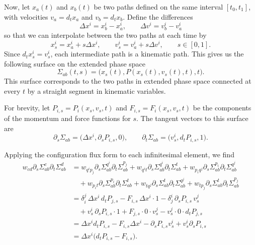 \documentclass[nofootinbib,aps,pre]{revtex4-2}
\begin{document}
Now, let $x_a(t)$ and $x_b(t)$ be two paths defined on the same interval $[t_0,t_1]$, with velocities $v_a=d_t x_a$ and $v_b=d_t x_b$. Define the differences
\begin{equation}
	\Delta x^i=x_b^i-x_a^i,
	\qquad
	\Delta v^i=v_b^i-v_a^i
\end{equation}
so that we can interpolate between the two paths at each time by
\begin{equation}
	x_s^i=x_a^i+s\Delta x^i,
	\qquad
	v_s^i=v_a^i+s\Delta v^i,
	\qquad s\in[0,1].
\end{equation}
Since $d_t x_s^i=v_s^i$, each intermediate path is a kinematic path. This gives us the following surface on the extended phase space
\begin{equation}
	\Sigma_{ab}(t,s)
	=
	\bigl(x_s(t),P(x_s(t),v_s(t),t),t\bigr).
\end{equation}
This surface corresponds to the two paths in extended phase space connected at every $t$ by a straight segment in kinematic variables.

For brevity, let $P_{i,s}=P_i(x_s,v_s,t)$ and $F_{i,s}=F_i(x_s,v_s,t)$ be the components of the momentum and force functions for $s$. The tangent vectors to this surface are
\begin{equation}
	\partial_s\Sigma_{ab}
	=
	\bigl(\Delta x^i,\partial_sP_{i,s},0\bigr),
	\qquad
	\partial_t\Sigma_{ab}
	=
	\bigl(v_s^i,d_tP_{i,s},1\bigr).
\end{equation}

Applying the configuration flux form to each infinitesimal element, we find
\begin{equation}
	\begin{aligned}
		w_{cd}\partial_s\Sigma_{ab}^{c}\partial_t\Sigma_{ab}^{d}
		&=
		w_{q^i p_j}
		\partial_s\Sigma_{ab}^{q^i}\partial_t\Sigma_{ab}^{p_j}
		+
		w_{q^i t}
		\partial_s\Sigma_{ab}^{q^i}\partial_t\Sigma_{ab}^{t} +
		w_{p_i q^j}
		\partial_s\Sigma_{ab}^{p_i}\partial_t\Sigma_{ab}^{q^j}
		\\
		&\quad+
		w_{p_i t}
		\partial_s\Sigma_{ab}^{p_i}\partial_t\Sigma_{ab}^{t} +
		w_{t q^j}
		\partial_s\Sigma_{ab}^{t}\partial_t\Sigma_{ab}^{q^j}
		+
		w_{t p_j}
		\partial_s\Sigma_{ab}^{t}\partial_t\Sigma_{ab}^{p_j}\\
		&=
		\delta_i^j\,\Delta x^i\,d_tP_{j,s}
		-F_{i,s}\,\Delta x^i\cdot1 -
		\delta_j^i\,\partial_sP_{i,s}\,v_s^j \\
		&\quad+v_s^i\,\partial_sP_{i,s}\cdot1 +
		F_{j,s}\cdot0\cdot v_s^j
		-v_s^j\cdot0\cdot d_tP_{j,s}\\
		&=
		\Delta x^i d_tP_{i,s}
		-F_{i,s}\Delta x^i
		-\partial_sP_{i,s}v_s^i
		+v_s^i\partial_sP_{i,s}\\
		&=
		\Delta x^i\bigl(d_tP_{i,s}-F_{i,s}\bigr).
	\end{aligned}
\end{equation}
\end{document}
